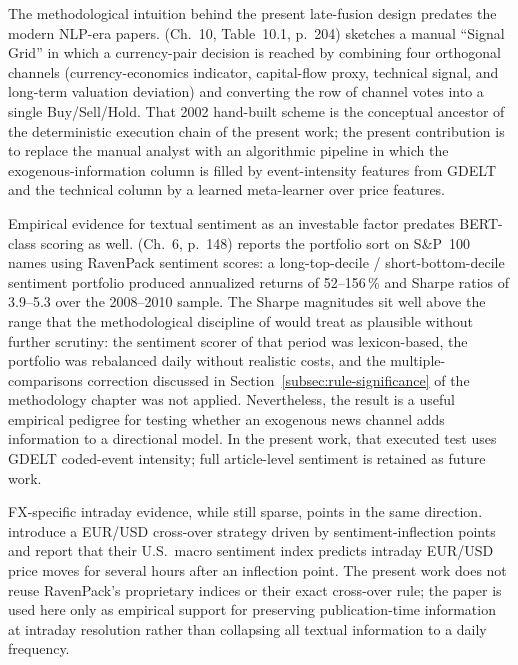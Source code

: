 The methodological intuition behind the present late-fusion design predates the modern NLP-era papers.  (Ch.~10, Table~10.1, p.~204) sketches a manual ``Signal Grid'' in which a currency-pair decision is reached by combining four orthogonal channels (currency-economics indicator, capital-flow proxy, technical signal, and long-term valuation deviation) and converting the row of channel votes into a single Buy/Sell/Hold. That 2002 hand-built scheme is the conceptual ancestor of the deterministic execution chain of the present work; the present contribution is to replace the manual analyst with an algorithmic pipeline in which the exogenous-information column is filled by event-intensity features from GDELT and the technical column by a learned meta-learner over price features.

Empirical evidence for textual sentiment as an investable factor predates BERT-class scoring as well.  (Ch.~6, p.~148) reports the  portfolio sort on S\&P~100 names using RavenPack sentiment scores: a long-top-decile / short-bottom-decile sentiment portfolio produced annualized returns of 52--156\,\% and Sharpe ratios of 3.9--5.3 over the 2008--2010 sample. The Sharpe magnitudes sit well above the range that the methodological discipline of  would treat as plausible without further scrutiny: the sentiment scorer of that period was lexicon-based, the portfolio was rebalanced daily without realistic costs, and the multiple-comparisons correction discussed in Section~\ref{subsec:rule-significance} of the methodology chapter was not applied. Nevertheless, the result is a useful empirical pedigree for testing whether an exogenous news channel adds information to a directional model. In the present work, that executed test uses GDELT coded-event intensity; full article-level sentiment is retained as future work.

FX-specific intraday evidence, while still sparse, points in the same direction.  introduce a EUR/USD cross-over strategy driven by sentiment-inflection points and report that their U.S.~macro sentiment index predicts intraday EUR/USD price moves for several hours after an inflection point. The present work does not reuse RavenPack's proprietary indices or their exact cross-over rule; the paper is used here only as empirical support for preserving publication-time information at intraday resolution rather than collapsing all textual information to a daily frequency.


